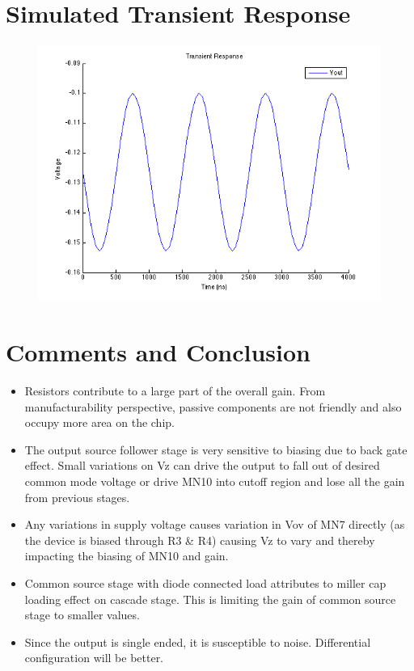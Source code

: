 \documentclass[12pt,a4paper]{article}
\begin{document}
\section{Simulated Transient Response}
\begin{figure}[h]
\centering
\includegraphics[scale=.75]{transient_response.png}
\end{figure}

\pagebreak




\section{Comments and Conclusion}


\begin{itemize}
\item Resistors contribute to a large part of the overall gain. From 
manufacturability perspective, passive components are not friendly and 
also occupy more area on the chip.
\item The output source follower stage is very sensitive to biasing due 
to back gate effect. Small variations on Vz can drive the output to fall 
out of desired common mode voltage or drive MN10 into cutoff region and 
lose all the gain from previous stages.
\item Any variations in supply voltage causes variation in Vov of MN7 
directly (as the device is biased through R3 \& R4) causing Vz to vary 
and thereby impacting the biasing of MN10 and gain.
\item Common source stage with diode connected load attributes to miller 
cap loading effect on cascade stage. This is limiting the gain of common 
source stage to smaller values.
\item Since the output is single ended, it is susceptible to noise. 
Differential configuration will be better.
\end{itemize}
\end{document}
